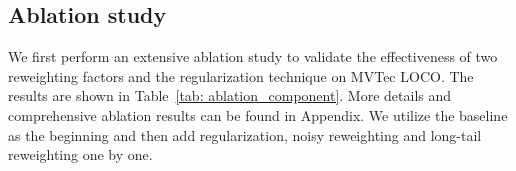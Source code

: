 \documentclass[letterpaper]{article} %
\begin{document}

\subsection{Ablation study}

We first perform an extensive ablation study to validate the effectiveness of two reweighting factors and the regularization technique on MVTec LOCO. The results are shown in Table~\ref{tab: ablation_component}. More details and comprehensive ablation results can be found in Appendix. We utilize the baseline as the beginning and then add regularization, noisy reweighting and long-tail reweighting one by one.
\end{document}

